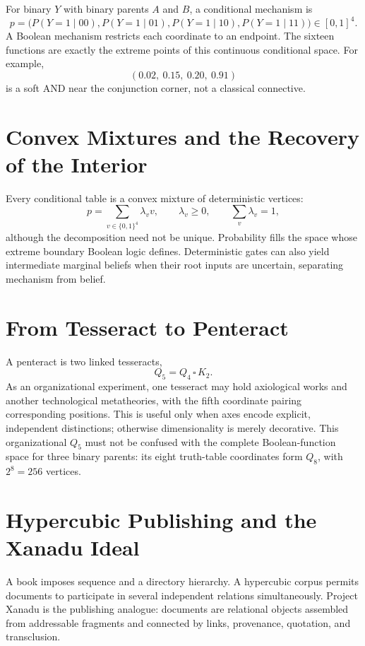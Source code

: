 \documentclass[11pt]{article}
\begin{document}
For binary $Y$ with binary parents $A$ and $B$, a conditional mechanism is
\[
p=\bigl(P(Y{=}1\mid00),P(Y{=}1\mid01),P(Y{=}1\mid10),P(Y{=}1\mid11)\bigr)\in[0,1]^4.
\]
A Boolean mechanism restricts each coordinate to an endpoint. The sixteen functions are exactly the extreme points of this continuous conditional space. For example,
\[
(0.02,\ 0.15,\ 0.20,\ 0.91)
\]
is a soft AND near the conjunction corner, not a classical connective.

\section{Convex Mixtures and the Recovery of the Interior}

Every conditional table is a convex mixture of deterministic vertices:
\[
p=\sum_{v\in\{0,1\}^4}\lambda_vv,\qquad
\lambda_v\geq0,\qquad\sum_v\lambda_v=1,
\]
although the decomposition need not be unique. Probability fills the space whose extreme boundary Boolean logic defines. Deterministic gates can also yield intermediate marginal beliefs when their root inputs are uncertain, separating mechanism from belief.

\section{From Tesseract to Penteract}

A penteract is two linked tesseracts,
\[
Q_5=Q_4\,\square\,K_2.
\]
As an organizational experiment, one tesseract may hold axiological works and another technological metatheories, with the fifth coordinate pairing corresponding positions. This is useful only when axes encode explicit, independent distinctions; otherwise dimensionality is merely decorative. This organizational $Q_5$ must not be confused with the complete Boolean-function space for three binary parents: its eight truth-table coordinates form $Q_8$, with $2^8=256$ vertices.

\section{Hypercubic Publishing and the Xanadu Ideal}

A book imposes sequence and a directory hierarchy. A hypercubic corpus permits documents to participate in several independent relations simultaneously. Project Xanadu is the publishing analogue: documents are relational objects assembled from addressable fragments and connected by links, provenance, quotation, and transclusion.
\end{document}
